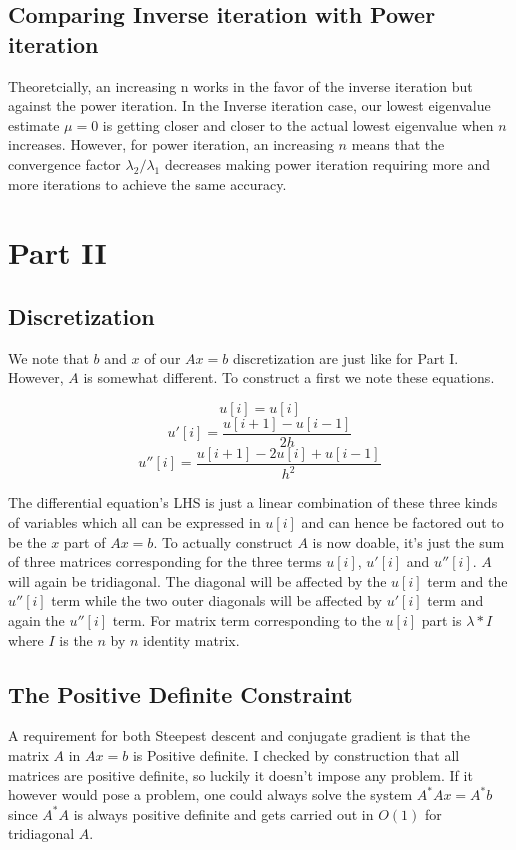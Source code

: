 \documentclass[a4paper,11pt]{article}
\begin{document}
\subsection{Comparing Inverse iteration with Power iteration}

Theoretcially, an increasing n works in the favor of the inverse iteration but
against the power iteration. In the Inverse iteration case, our lowest
eigenvalue estimate $\mu=0$ is getting closer and closer to the actual
lowest eigenvalue when $n$ increases. However, for power iteration, an
increasing $n$ means that the convergence factor $\lambda_2/\lambda_1$
decreases making power iteration requiring more and more iterations to
achieve the same accuracy.

\section{Part II}

\subsection{Discretization}

We note that $b$ and $x$ of our $Ax=b$ discretization are just like for
Part I.  However, $A$ is somewhat different. To construct a first we
note these equations.

\[
  u[i] = u[i]
\]
\[
  u'[i] = \frac{u[i+1]-u[i-1]}{2h}
\]
\[
  u''[i] = \frac{u[i+1]-2u[i]+u[i-1]}{h^2}
\]

The differential equation's LHS is just a linear combination of these
three kinds of variables which all can be expressed in $u[i]$ and can
hence be factored out to be the $x$ part of $Ax=b$. To actually
construct $A$ is now doable, it's just the sum of three matrices
corresponding for the three terms $u[i]$, $u'[i]$ and $u''[i]$. $A$ will
again be tridiagonal. The diagonal will be affected by the $u[i]$ term
and the $u''[i]$ term while the two outer diagonals will be affected by
$u'[i]$ term and again the $u''[i]$ term. For matrix term corresponding
to the $u[i]$ part is $\lambda*I$ where $I$ is the $n$ by $n$ identity
matrix.

\subsection{The Positive Definite Constraint}

A requirement for both Steepest descent and conjugate gradient is that
the matrix $A$ in $Ax=b$ is Positive definite. I checked by construction
that all matrices are positive definite, so luckily it doesn't impose
any problem. If it however would pose a problem, one could always solve
the system $A^{*}Ax=A^{*}b$ since $A^*A$ is always positive definite and
gets carried out in $O(1)$ for tridiagonal $A$.
\end{document}
